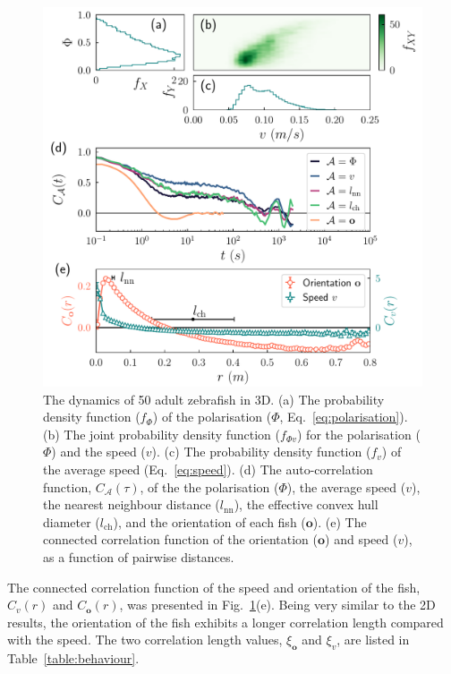 \documentclass[11pt,twoside]{report}
\begin{document}
\begin{figure}
  \includegraphics[width=\linewidth]{dynamics-3d-50}
  \caption[The dynamics of 50 fish in 3D]{
  	The dynamics of 50 adult zebrafish in 3D.
  	(a) The probability density function ($f_\Phi$) of the polarisation ($\Phi$, Eq.~\ref{eq:polarisation}).
  	(b) The joint probability density function ($f_{\Phi v}$) for the polarisation ($\Phi$) and the speed ($v$).
  	(c) The probability density function ($f_v$) of the average speed (Eq.~\ref{eq:speed}).
  	(d) The auto-correlation function, $C_\mathcal{A}(\tau)$, of the the polarisation ($\Phi$), the average speed ($v$), the nearest neighbour distance ($l_\mathrm{nn}$), the effective convex hull diameter ($l_\mathrm{ch}$), and the orientation of each fish ($\mathbf{o}$).
  	(e) The connected correlation function of the orientation ($\mathbf{o}$) and speed ($v$), as a function of pairwise distances.
  }
  \label{fig:dynamics-3d}
\end{figure}


The connected correlation function of the speed and orientation of the fish, $C_v(r)$ and $C_\mathbf{o}(r)$, was presented in Fig.~\ref{fig:dynamics-3d}(e). Being very similar to the 2D results, the orientation of the fish exhibits a longer correlation length compared with the speed. The two correlation length values, $\xi_\mathbf{o}$ and $\xi_v$, are listed in Table~\ref{table:behaviour}.
\end{document}
